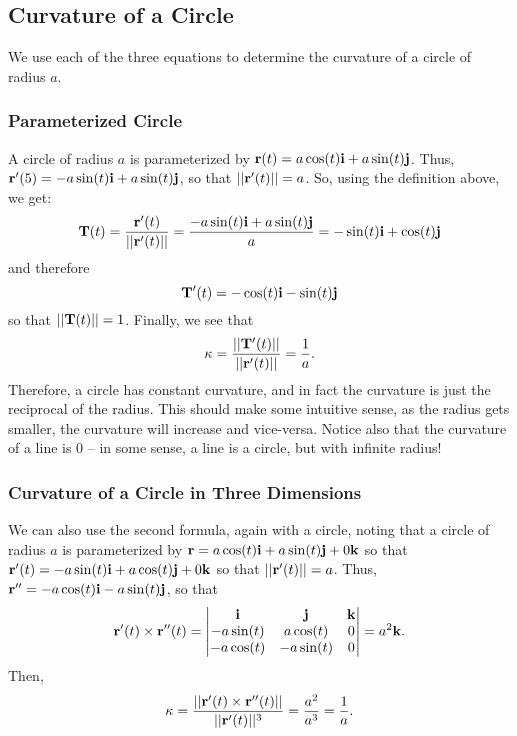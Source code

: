\subsection{Curvature of a Circle}

We use each of the three equations to determine the curvature of a circle of radius \(a\).

\subsubsection{Parameterized Circle}

A circle of radius \(a\) is parameterized by \(\mathbf{r}(t) = a \cos(t)\mathbf{i} + a \sin(t)\mathbf{j}\). Thus, \(\mathbf{r}'(5) = -a \sin(t)\mathbf{i} + a \sin(t)\mathbf{j}\), so that \(||\mathbf{r}'(t)|| = a\). So, using the definition above, we get:
\[
    \mathbf{T}(t) = \frac{\mathbf{r}'(t)}{||\mathbf{r}'(t)||} = \frac{-a \sin(t)\mathbf{i} + a \sin(t)\mathbf{j}}{a} = -\sin(t)\mathbf{i} + \cos(t)\mathbf{j}
\]
and therefore
\[
    \mathbf{T}'(t) = -\cos(t)\mathbf{i} - \sin(t)\mathbf{j}
\]
so that \(||\mathbf{T}(t)|| = 1\). Finally, we see that 
\[
    \kappa = \frac{||\mathbf{T}'(t)||}{||\mathbf{r}'(t)||} = \frac{1}{a}.
\]
Therefore, a circle has constant curvature, and in fact the curvature is just the reciprocal of the radius. This should make some intuitive sense, as the radius gets smaller, the curvature will increase and vice-versa. Notice also that the curvature of a line is 0 -- in some sense, a line is a circle, but with infinite radius!

\subsubsection{Curvature of a Circle in Three Dimensions}

We can also use the second formula, again with a circle, noting that a circle of radius \(a\) is parameterized by \(\mathbf{r} = a \cos(t)\mathbf{i} + a \sin(t)\mathbf{j} + 0\mathbf{k}\) so that \(\mathbf{r}'(t) = -a \sin(t)\mathbf{i} + a \cos(t)\mathbf{j} + 0\mathbf{k}\) so that \(||\mathbf{r}'(t)|| = a\). Thus, \(\mathbf{r}'' = -a \cos(t)\mathbf{i} - a \sin(t)\mathbf{j}\), so that 
\[
    \mathbf{r}'(t) \times \mathbf{r}''(t) = \begin{vmatrix}
        \mathbf{i} & \mathbf{j} & \mathbf{k} \\
        -a \sin(t) & a \cos(t) & 0 \\
        -a \cos(t) & -a \sin(t) & 0
    \end{vmatrix} = a^{2}\mathbf{k}.
\] 
Then, 
\[
    \kappa = \frac{||\mathbf{r}'(t) \times \mathbf{r}''(t)||}{||\mathbf{r}'(t)||^{3}} = \frac{a^{2}}{a^{3}} = \frac{1}{a}.
\]

